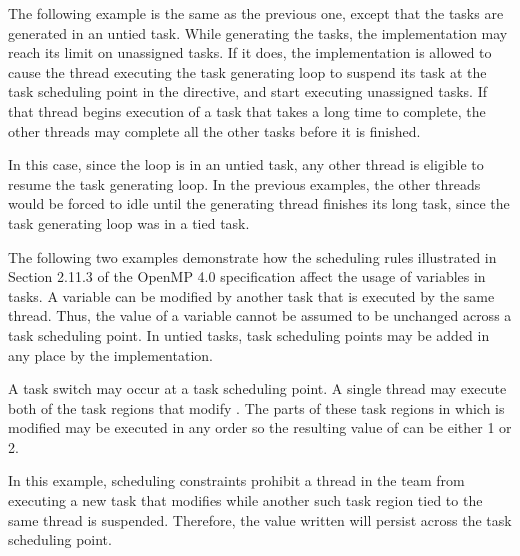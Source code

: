 \pagebreak
{}

The following example is the same as the previous one, except that the tasks are 
generated in an untied task. While generating the tasks, the implementation may 
reach its limit on unassigned tasks. If it does, the implementation is allowed 
to cause the thread executing the task generating loop to suspend its task at the 
task scheduling point in the  directive, and start executing unassigned 
tasks.  If that thread begins execution of a task that takes a long time to complete, 
the other threads may complete all the other tasks before it is finished.

In this case, since the loop is in an untied task, any other thread is eligible 
to resume the task generating loop. In the previous examples, the other threads 
would be forced to idle until the generating thread finishes its long task, since 
the task generating loop was in a tied task.



The following two examples demonstrate how the scheduling rules illustrated in 
Section 2.11.3 of the OpenMP 4.0 specification affect the usage of 
 variables in tasks. A  
variable can be modified by another task that is executed by the same thread. Thus, 
the value of a  variable cannot be assumed to be unchanged 
across a task scheduling point. In untied tasks, task scheduling points may be 
added in any place by the implementation.

A task switch may occur at a task scheduling point. A single thread may execute 
both of the task regions that modify . The parts of these task regions 
in which  is modified may be executed in any order so the resulting 
value of  can be either 1 or 2.




In this example, scheduling constraints prohibit a thread in the team from executing 
a new task that modifies   while another such task region tied to the 
same thread is suspended. Therefore, the value written will persist across the 
task scheduling point.




